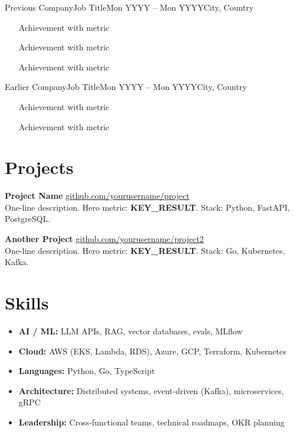 \vspace{6pt}

\cventry
  {Previous Company}{Job Title}{Mon YYYY -- Mon YYYY}{City, Country}
\begin{itemize}
  \item [Achievement with metric]
  \item [Achievement with metric]
  \item [Achievement with metric]
\end{itemize}

\vspace{6pt}

\cventry
  {Earlier Company}{Job Title}{Mon YYYY -- Mon YYYY}{City, Country}
\begin{itemize}
  \item [Achievement with metric]
  \item [Achievement with metric]
\end{itemize}

\section{Projects}

\textbf{Project Name} \hfill
\href{https://github.com/yourusername/project}{github.com/yourusername/project}\\
One-line description. Hero metric: \textbf{KEY\_RESULT}. Stack: Python, FastAPI, PostgreSQL.

\vspace{4pt}

\textbf{Another Project} \hfill
\href{https://github.com/yourusername/project2}{github.com/yourusername/project2}\\
One-line description. Hero metric: \textbf{KEY\_RESULT}. Stack: Go, Kubernetes, Kafka.

\section{Skills}

\begin{itemize}[leftmargin=0pt, label={}]
  \item \textbf{AI / ML:}          LLM APIs, RAG, vector databases, evals, MLflow
  \item \textbf{Cloud:}            AWS (EKS, Lambda, RDS), Azure, GCP, Terraform, Kubernetes
  \item \textbf{Languages:}        Python, Go, TypeScript
  \item \textbf{Architecture:}     Distributed systems, event-driven (Kafka), microservices, gRPC
  \item \textbf{Leadership:}       Cross-functional teams, technical roadmaps, OKR planning
\end{itemize}

